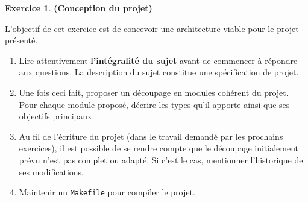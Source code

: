 \documentclass[11pt]{article}
\theoremstyle{definition}
\newtheorem{Exercice}{Exercice}
\begin{document}
\begin{Exercice} {\bf (Conception du projet)}\smallskip

L'objectif de cet exercice est de concevoir une architecture viable pour
le projet présenté.
\smallskip

\begin{enumerate}
    \item Lire attentivement {\bf l'intégralité du sujet} avant de 
    commencer à répondre aux questions. La description du sujet constitue 
    une spécification de projet. 
    \smallskip
    
    \item Une fois ceci fait, proposer un découpage en modules cohérent 
    du projet. Pour chaque module proposé, décrire les types qu'il apporte 
    ainsi que ses objectifs principaux.
    \smallskip
    
    \item Au fil de l'écriture du projet (dans le travail demandé par les 
    prochains exercices), il est possible de se rendre compte que le 
    découpage initialement prévu n'est pas complet ou adapté. Si c'est 
    le cas, mentionner l'historique de ses modifications.
    \smallskip
    
    \item Maintenir un {\tt Makefile} pour compiler le projet.
\end{enumerate}
\end{Exercice}
\bigskip
\end{document}
